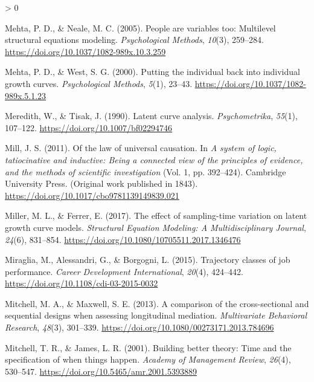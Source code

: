 \documentclass[
12pt, %
twoside,
english]{guelphthesis}
\newlength{\cslhangindent}
\newenvironment{CSLReferences}[2] %
 {%
  \setlength{\parindent}{0pt}
  \ifodd #1 \everypar{\setlength{\hangindent}{\cslhangindent}}\ignorespaces\fi
  \ifnum #2 > 0
  \setlength{\parskip}{\linespacing{2}}
  \fi
 }%
 {}
\theoremstyle{definition}
\theoremstyle{definition}
\theoremstyle{definition}
\theoremstyle{definition}
\theoremstyle{remark}
\begin{document}
\begin{CSLReferences}{1}{0}
\leavevmode{}%
Mehta, P. D., \& Neale, M. C. (2005). People are variables too: Multilevel structural equations modeling. \emph{Psychological Methods}, \emph{10}(3), 259--284. \url{https://doi.org/10.1037/1082-989x.10.3.259}

\leavevmode{}%
Mehta, P. D., \& West, S. G. (2000). Putting the individual back into individual growth curves. \emph{Psychological Methods}, \emph{5}(1), 23--43. \url{https://doi.org/10.1037/1082-989x.5.1.23}

\leavevmode{}%
Meredith, W., \& Tisak, J. (1990). Latent curve analysis. \emph{Psychometrika}, \emph{55}(1), 107--122. \url{https://doi.org/10.1007/bf02294746}

\leavevmode{}%
Mill, J. S. (2011). Of the law of universal causation. In \emph{A system of logic, tatiocinative and inductive: Being a connected view of the principles of evidence, and the methods of scientific investigation} (Vol. 1, pp. 392--424). Cambridge University Press. (Original work published in 1843). \url{https://doi.org/10.1017/cbo9781139149839.021}

\leavevmode{}%
Miller, M. L., \& Ferrer, E. (2017). The effect of sampling-time variation on latent growth curve models. \emph{Structural Equation Modeling: A Multidisciplinary Journal}, \emph{24}(6), 831--854. \url{https://doi.org/10.1080/10705511.2017.1346476}

\leavevmode{}%
Miraglia, M., Alessandri, G., \& Borgogni, L. (2015). Trajectory classes of job performance. \emph{Career Development International}, \emph{20}(4), 424--442. \url{https://doi.org/10.1108/cdi-03-2015-0032}

\leavevmode{}%
Mitchell, M. A., \& Maxwell, S. E. (2013). A comparison of the cross-sectional and sequential designs when assessing longitudinal mediation. \emph{Multivariate Behavioral Research}, \emph{48}(3), 301--339. \url{https://doi.org/10.1080/00273171.2013.784696}

\leavevmode{}%
Mitchell, T. R., \& James, L. R. (2001). Building better theory: Time and the specification of when things happen. \emph{Academy of Management Review}, \emph{26}(4), 530--547. \url{https://doi.org/10.5465/amr.2001.5393889}


\end{CSLReferences}
\end{document}
